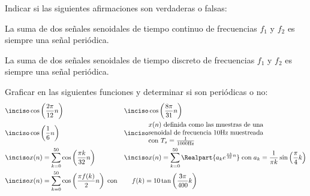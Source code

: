 \begin{ejercicio}
Indicar si las siguientes afirmaciones son verdaderas o falsas:

\inciso La suma de dos señales senoidales de tiempo continuo de frecuencias $f_1$ y $f_2$ es siempre una señal periódica. 

\inciso La suma de dos señales senoidales de tiempo discreto de frecuencias $f_1$ y $f_2$ es siempre una señal periódica. 

\end{ejercicio}

\begin{ejercicio}
Graficar en \Keyboardsym las siguientes funciones y determinar si son periódicas o no:
\begin{align*}
    \inciso & \cos\left(\frac{2\pi}{12} n\right) & \inciso & \cos\left(\frac{8\pi}{31} n\right) \\ 
    \inciso & \cos\left(\frac{1}{6} n\right) & \inciso & \parbox{.5\textwidth}{$x(n)$ definida como las muestras de una senoidal de frecuencia 10Hz muestreada con $T_s=\frac{1}{1000\mathrm{Hz}}$} \\
    \inciso & x(n) = \sum_{k=0}^{50}\cos\left(\frac{\pi k}{32}n\right) & \inciso & x(n) = \sum_{k=0}^{50} \Realpart{a_ke^{\frac{\pi k}{32}n}}\; \mathrm{con}\; a_k = \frac{1}{\pi k} \sin\left(\frac{\pi}{4} k\right)  \\ 
    \inciso & x(n) = \sum_{k=0}^{50}\cos\left(\frac{\pi f(k)}{2}n\right)\; \mathrm{con} & & \hspace{-2.5em} f(k) = 10 \tan\left(\frac{3\pi}{400} k\right)
\end{align*}
\end{ejercicio}
